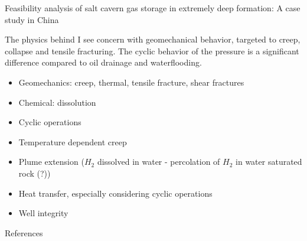 \begin{frame}{\cite{zhao22} Feasibility analysis of salt cavern gas storage in extremely deep formation: A case study in China}
\end{frame}
%
%
\begin{frame}{The physics behind}
I see concern with geomechanical behavior, targeted to creep, collapse and tensile fracturing. The cyclic behavior of the pressure is a significant difference compared to oil drainage and waterflooding.
\begin{itemize}
\item Geomechanics: creep, thermal, tensile fracture, shear fractures
\item Chemical: dissolution
\item Cyclic operations
\item Temperature dependent creep
\item Plume extension ($H_2$ dissolved in water - percolation of $H_2$ in water saturated rock (?))
\item Heat transfer, especially considering cyclic operations
\item Well integrity
\end{itemize}
\end{frame}

\begin{frame}[shrink=50, fragile]{References}


\end{frame}
